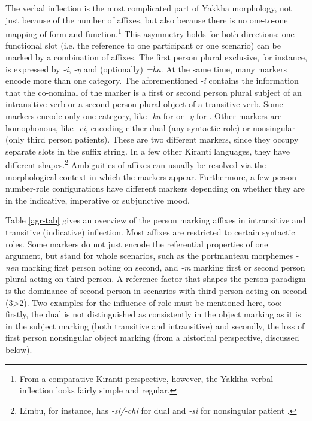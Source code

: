 The verbal inflection is the most complicated part of Yakkha morphology, not just because of the number of affixes, but also because there is no one-to-one mapping of form and function.\footnote{From a comparative Kiranti perspective, however, the Yakkha verbal inflection looks fairly simple and regular.} This asymmetry holds for both directions: one functional slot (i.e. the reference to one participant or one scenario) can be marked by a combination of affixes. The first person plural exclusive, for instance, is expressed by \emph{-i}, \emph{-ŋ} and (optionally) \emph{=ha}. At the same time, many markers  encode more than one category. The aforementioned \emph{-i} contains the information that the co-nominal of the marker is a first or second person plural subject of an intransitive verb or a second person plural object of a transitive verb.  Some markers encode only one category, like \emph{-ka} for  or \emph{-ŋ} for . Other markers are homophonous, like \emph{-ci}, encoding either dual (any syntactic role) or nonsingular (only third person patients). These are two different markers, since they occupy separate slots in the suffix string. In a few other Kiranti languages, they have different shapes.\footnote{Limbu, for instance, has \emph{-si/-chi} for dual and \emph{-si} for nonsingular patient \citep[75]{Driem1987A-grammar}.} Ambiguities of affixes can  usually be resolved via the morphological context in which the markers appear. Furthermore,  a few person-number-role configurations have different markers depending on whether they are in the indicative, imperative or subjunctive mood. 


Table \ref{agr-tab} gives an overview of the person marking affixes in intransitive and transitive (indicative) inflection. Most affixes are restricted to certain syntactic roles. Some markers do not just encode the referential properties  of one argument, but stand for whole scenarios, such as the portmanteau morphemes \emph{-nen} marking first person acting on second, and \emph{-m} marking first or second person plural acting on third person. A reference factor that shapes the person paradigm is the dominance of second person in scenarios with third person acting on second (3>2). Two examples for the influence of role must be mentioned here, too: firstly, the dual is not distinguished as consistently in the object marking as it is in the subject marking (both transitive and intransitive) and secondly, the loss of first person nonsingular object marking (from a historical perspective, discussed below). 


